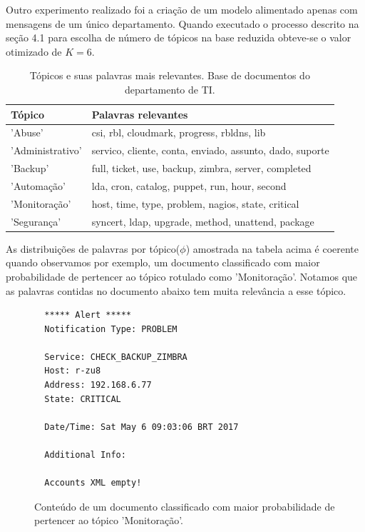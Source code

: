 \documentclass[12pt,a4paper]{article}
\begin{document}
Outro experimento realizado foi a criação de um modelo alimentado apenas com mensagens de um único departamento.
 Quando executado o processo descrito na seção 4.1 para escolha de número de tópicos na base reduzida obteve-se o valor otimizado de $K=6$.

\begin{table}[H]
  \centering
  \begin{tabular}{ll}
  Tópico                   & Palavras relevantes \\
  \hline
  'Abuse'                    & csi, rbl, cloudmark, progress, rbldns, lib \\
  'Administrativo'           & servico, cliente, conta, enviado, assunto, dado, suporte \\
  'Backup'                   & full, ticket, use, backup, zimbra, server, completed  \\
  'Automação'                & lda, cron, catalog, puppet, run, hour, second \\
  'Monitoração'              & host, time, type, problem, nagios, state, critical \\
  'Segurança'                & syncert, ldap, upgrade, method, unattend, package \\
  \hline
  \end{tabular}
  \caption{Tópicos e suas palavras mais relevantes. Base de documentos do departamento de TI.}
  \label{tab-nich-topics}
\end{table}

As distribuições de palavras por tópico($\phi$) amostrada na tabela acima é coerente quando observamos por exemplo, um documento classificado com maior
 probabilidade de pertencer ao tópico rotulado como 'Monitoração'. Notamos que as palavras contidas no documento abaixo tem muita relevância a esse tópico.


\begin{figure}[H]
  \scriptsize
  \begin{verbatim}
  ***** Alert *****
  Notification Type: PROBLEM

  Service: CHECK_BACKUP_ZIMBRA
  Host: r-zu8
  Address: 192.168.6.77
  State: CRITICAL

  Date/Time: Sat May 6 09:03:06 BRT 2017

  Additional Info:

  Accounts XML empty!
  \end{verbatim}
  \normalsize
  \caption{Conteúdo de um documento classificado com maior probabilidade de pertencer ao tópico 'Monitoração'.}
  \label{mo}
\end{figure}
\end{document}
